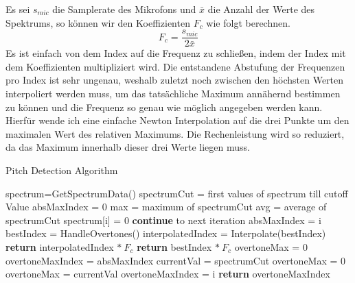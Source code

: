 Es sei $s_{mic}$ die Samplerate des Mikrofons und $\bar{x}$ die Anzahl der Werte des Spektrums, so können wir den Koeffizienten $F_c$ wie folgt berechnen.
$$ F_c = \frac{s_{mic}}{2\bar{x}} $$
Es ist einfach von dem Index auf die Frequenz zu schließen, indem der Index mit dem Koeffizienten multipliziert wird. Die entstandene Abstufung der Frequenzen pro Index ist sehr ungenau, weshalb zuletzt noch zwischen den höchsten Werten interpoliert werden muss, um das tatsächliche Maximum annähernd bestimmen zu können und die Frequenz so genau wie möglich angegeben werden kann. Hierfür wende ich eine einfache Newton Interpolation auf die drei Punkte um den maximalen Wert des relativen Maximums. Die Rechenleistung wird so reduziert, da das Maximum innerhalb dieser drei Werte liegen muss. 

\begin{algorithm}
    \caption{Pitch Detection Algorithm}
   \begin{algorithmic}[1]
        \State spectrum=GetSpectrumData()
        \State spectrumCut = first values of spectrum till cutoff Value 
        \State absMaxIndex = 0 
        \State max = maximum of spectrumCut
        \State avg = average of spectrumCut
                \State spectrum[i] = 0
                \State \textbf{continue} to next iteration
            \EndIf
                \State absMaxIndex = i
            \EndIf
        \EndFor
        \State bestIndex = HandleOvertones()
        \State interpolatedIndex = Interpolate(bestIndex)
            \State \textbf{return} interpolatedIndex $* \ F_c$
        \EndIf
        \State \textbf{return} bestIndex $* \ F_c$
   \EndFunction
    \State
        \State overtoneMax = 0
        \State overtoneMaxIndex = absMaxIndex
            \State currentVal = spectrumCut
                \State overtoneMax = 0
            \EndIf
                    \State overtoneMax = currentVal
                    \State overtoneMaxIndex = i
                \EndIf
            \EndIf
        \EndFor
        \State \textbf{return} overtoneMaxIndex
    \EndFunction
    \end{algorithmic}
\end{algorithm}



